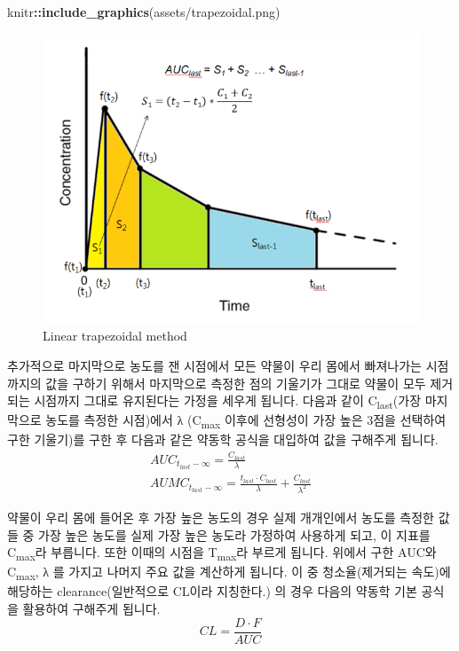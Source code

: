 \documentclass[
  12pt,
]{krantz}
\newenvironment{Shaded}{\begin{snugshade}}{\end{snugshade}}
\newcommand{\KeywordTok}[1]{\textcolor[rgb]{0.13,0.29,0.53}{\textbf{#1}}}
\newcommand{\NormalTok}[1]{#1}
\newcommand{\OperatorTok}[1]{\textcolor[rgb]{0.81,0.36,0.00}{\textbf{#1}}}
\newcommand{\StringTok}[1]{\textcolor[rgb]{0.31,0.60,0.02}{#1}}
\begin{document}
\begin{Shaded}
\begin{Highlighting}[]
\NormalTok{knitr}\OperatorTok{::}\KeywordTok{include\_graphics}\NormalTok{(}\StringTok{\textquotesingle{}assets/trapezoidal.png\textquotesingle{}}\NormalTok{)}
\end{Highlighting}
\end{Shaded}

\begin{figure}
\includegraphics[width=1\linewidth]{assets/trapezoidal} \caption{Linear trapezoidal method}\label{fig:trapezoid}
\end{figure}

추가적으로 마지막으로 농도를 잰 시점에서 모든 약물이 우리 몸에서 빠져나가는 시점까지의 값을 구하기 위해서 마지막으로 측정한 점의 기울기가 그대로 약물이 모두 제거되는 시점까지 그대로 유지된다는 가정을 세우게 됩니다.
다음과 같이 C\textsubscript{last}(가장 마지막으로 농도를 측정한 시점)에서 λ (C\textsubscript{max} 이후에 선형성이 가장 높은 3점을 선택하여 구한 기울기)를 구한 후 다음과 같은 약동학 공식을 대입하여 값을 구해주게 됩니다.
\begin{equation}
\begin{split}
AUC_{t_{last}-\infty} = 
  \frac{C_{last}}{\lambda} \\
AUMC_{t_{last}-\infty} = 
  \frac{t_{last} \cdot C_{last}}{\lambda} + 
  \frac{C_{last}}{\lambda^2}
\end{split}
\label{eq:terminal-slope}
\end{equation}

약물이 우리 몸에 들어온 후 가장 높은 농도의 경우 실제 개개인에서 농도를 측정한 값들 중 가장 높은 농도를 실제 가장 높은 농도라 가정하여 사용하게 되고, 이 지표를 C\textsubscript{max}라 부릅니다. 또한 이때의 시점을 T\textsubscript{max}라 부르게 됩니다.
위에서 구한 AUC와 C\textsubscript{max}, λ 를 가지고 나머지 주요 값을 계산하게 됩니다.
이 중 청소율(제거되는 속도)에 해당하는 clearance(일반적으로 CL이라 지칭한다.) 의 경우 다음의 약동학 기본 공식을 활용하여 구해주게 됩니다.
\begin{equation}
CL = \frac{D \cdot F}{AUC}
\label{eq:clearance}
\end{equation}
\end{document}
